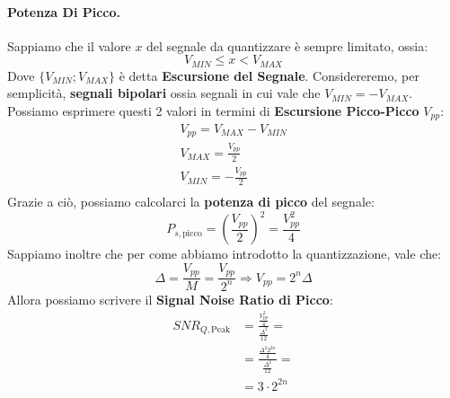\paragraph{Potenza Di Picco.}Sappiamo che il valore $x$ del segnale da quantizzare è sempre limitato, ossia:
\begin{equation*}
    V_{MIN} \leq x < V_{MAX}
\end{equation*}
Dove $\{V_{MIN}; V_{MAX}\}$ è detta \textbf{Escursione del Segnale}. Considereremo, per semplicità, \textbf{segnali bipolari}
ossia segnali in cui vale che $V_{MIN} = - V_{MAX}$. Possiamo esprimere questi 2 valori in termini di \textbf{Escursione Picco-Picco} $V_{pp}$:
\begin{gather}
    V_{pp} = V_{MAX} - V_{MIN}\\
    V_{MAX} = \frac{V_{pp}}{2}\\
    V_{MIN} = -\frac{V_{pp}}{2}\\
\end{gather}
Grazie a ciò, possiamo calcolarci la \textbf{potenza di picco} del segnale:
\begin{equation}
    P_{s,\text{picco}} = \left(\frac{V_{pp}}{2}\right)^2 = \frac{V^2_{pp}}{4}
\end{equation}
Sappiamo inoltre che per come abbiamo introdotto la quantizzazione, vale che:
\begin{equation*}
    \Delta = \frac{V_{pp}}{M} = \frac{V_{pp}}{2^n} \Rightarrow V_{pp} = 2^n\Delta
\end{equation*}
Allora possiamo scrivere il \textbf{Signal Noise Ratio di Picco}:
\begin{align*}
    SNR_{Q,\text{Peak}} &= \frac{\frac{V^2_{pp}}{4}}{\frac{\Delta^2}{12}} =\\
                        &= \frac{\frac{\Delta^2 2^{2n}}{4}}{\frac{\Delta^2}{12}}=\\
                        &= 3 \cdot 2^{2n}
\end{align*}
